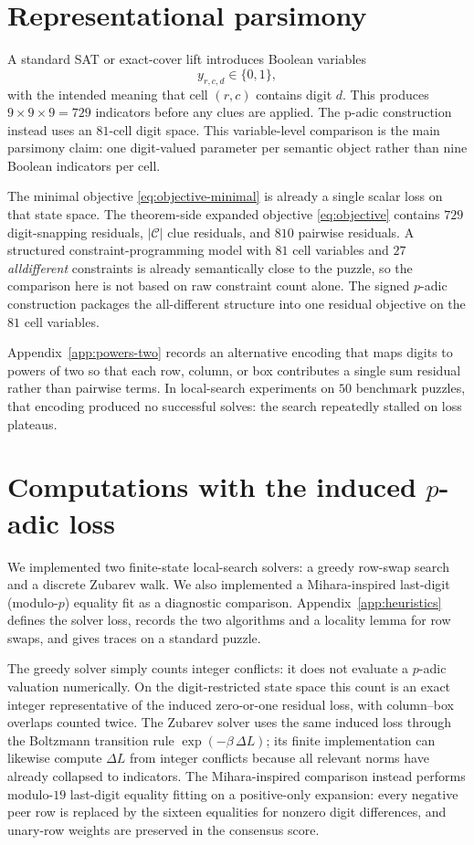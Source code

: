 \documentclass[11pt]{article}
\begin{document}
\section{Representational parsimony}
\label{sec:parsimony}

A standard SAT or exact-cover lift introduces Boolean variables
\[
y_{r,c,d}\in\{0,1\},
\]
with the intended meaning that cell $(r,c)$ contains digit $d$. This produces \(9\times 9\times 9=729\) indicators before any clues are applied. The p-adic construction instead uses an \(81\)-cell digit space. This variable-level comparison is the main parsimony claim: one digit-valued parameter per semantic object rather than nine Boolean indicators per cell.

The minimal objective \eqref{eq:objective-minimal} is already a single scalar loss on that state space. The theorem-side expanded objective \eqref{eq:objective} contains \(729\) digit-snapping residuals, \(|\mathcal{C}|\) clue residuals, and \(810\) pairwise residuals. A structured constraint-programming model with \(81\) cell variables and \(27\) \emph{alldifferent} constraints is already semantically close to the puzzle, so the comparison here is not based on raw constraint count alone. The signed $p$-adic construction packages the all-different structure into one residual objective on the \(81\) cell variables.

Appendix~\ref{app:powers-two} records an alternative encoding that maps digits to powers of two so that each row, column, or box contributes a single sum residual rather than pairwise terms. In local-search experiments on \(50\) benchmark puzzles, that encoding produced no successful solves: the search repeatedly stalled on loss plateaus.

\section{Computations with the induced \texorpdfstring{\(p\)-adic}{p-adic} loss}
\label{sec:illustrative-computations}

We implemented two finite-state local-search solvers: a greedy row-swap search and a discrete Zubarev walk. We also implemented a Mihara-inspired last-digit (modulo-\(p\)) equality fit as a diagnostic comparison. Appendix~\ref{app:heuristics} defines the solver loss, records the two algorithms and a locality lemma for row swaps, and gives traces on a standard puzzle.

The greedy solver simply counts integer conflicts: it does not evaluate a \(p\)-adic valuation numerically. On the digit-restricted state space this count is an exact integer representative of the induced zero-or-one residual loss, with column--box overlaps counted twice. The Zubarev solver uses the same induced loss through the Boltzmann transition rule \(\exp(-\beta\,\Delta L)\); its finite implementation can likewise compute \(\Delta L\) from integer conflicts because all relevant norms have already collapsed to indicators. The Mihara-inspired comparison instead performs modulo-\(19\) last-digit equality fitting on a positive-only expansion: every negative peer row is replaced by the sixteen equalities for nonzero digit differences, and unary-row weights are preserved in the consensus score.
\end{document}
